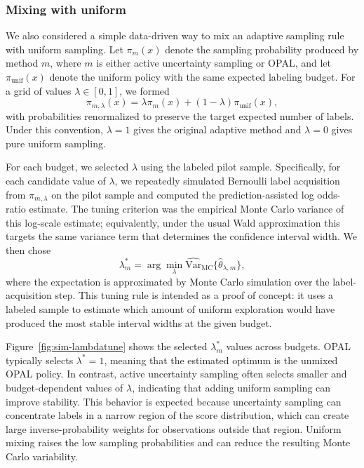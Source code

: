 \subsubsection{Mixing with uniform}
\label{app:mixing}

We also considered a simple data-driven way to mix an adaptive sampling rule with uniform sampling.  Let
\(\pi_m(x)\) denote the sampling probability produced by method \(m\), where \(m\) is either active uncertainty sampling or OPAL, and let \(\pi_{\mathrm{unif}}(x)\) denote the uniform policy with the same expected labeling budget.  For a grid of values \(\lambda \in [0,1]\), we formed
\[
    \pi_{m,\lambda}(x)
    =
    \lambda \pi_m(x) + (1-\lambda)\pi_{\mathrm{unif}}(x),
\]
with probabilities renormalized to preserve the target expected number of labels.  Under this convention, \(\lambda=1\) gives the original adaptive method and \(\lambda=0\) gives pure uniform sampling.

For each budget, we selected \(\lambda\) using the labeled pilot sample.  Specifically, for each candidate value of \(\lambda\), we repeatedly simulated Bernoulli label acquisition from \(\pi_{m,\lambda}\) on the pilot sample and computed the prediction-assisted log odds-ratio estimate.  The tuning criterion was the empirical Monte Carlo variance of this log-scale estimate; equivalently, under the usual Wald approximation this targets the same variance term that determines the confidence interval width.  We then chose
\[
    \lambda_m^*
    =
    \arg\min_{\lambda}
    \widehat{\mathrm{Var}}_{\mathrm{MC}}\{\hat\theta_{\lambda,m}\},
\]
where the expectation is approximated by Monte Carlo simulation over the label-acquisition step.  This tuning rule is intended as a proof of concept: it uses a labeled sample to estimate which amount of uniform exploration would have produced the most stable interval widths at the given budget.

Figure~\ref{fig:sim-lambdatune} shows the selected \(\lambda_m^*\) values across budgets.  OPAL typically selects \(\lambda^*=1\), meaning that the estimated optimum is the unmixed OPAL policy.  In contrast, active uncertainty sampling often selects smaller and budget-dependent values of \(\lambda\), indicating that adding uniform sampling can improve stability.  This behavior is expected because uncertainty sampling can concentrate labels in a narrow region of the score distribution, which can create large inverse-probability weights for observations outside that region.  Uniform mixing raises the low sampling probabilities and can reduce the resulting Monte Carlo variability.

